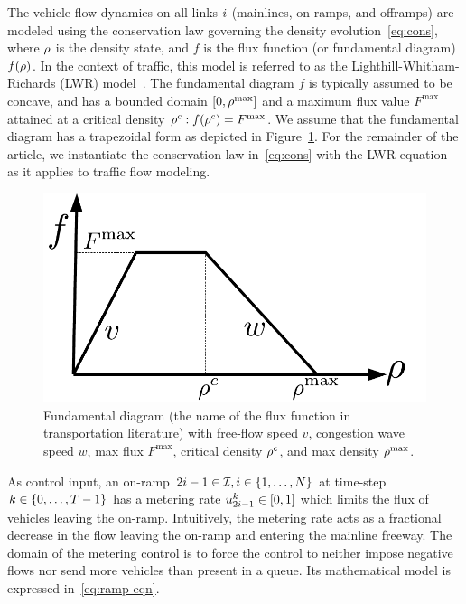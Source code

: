 				
		The vehicle flow dynamics on all links $i$ (mainlines, on-ramps,
		and offramps) are modeled using the conservation law governing the
		density evolution~\eqref{eq:cons}, where $\rho$ is the
		density state, and $f$ is the flux function (or fundamental diagram)
		$f\left(\density\right)$. In the context of traffic, this model is
		referred to as the Lighthill-Whitham-Richards (LWR) model~\cite{lighthill1955kinematic,richards1956shock}.
		The fundamental diagram $f$ is typically assumed to be concave, and
		has a bounded domain $\left[0,\density^{\max}\right]$ and a maximum
		flux value $F^{\max}$ attained at a critical density $\density^{c}:f\left(\density^{c}\right)=F^{\max}$.
		We assume that the fundamental diagram has a trapezoidal form as depicted
		in Figure~\ref{fig:Fundamental-diagram-with}. For the remainder
		of the article, we instantiate the conservation law in~\eqref{eq:cons}
		with the LWR equation as it applies to traffic flow modeling.\begin{figure}%
		\begin{centering}
			\includegraphics[width=0.4\columnwidth]{figs-gen/fd}
			\par\end{centering}
						
			\caption{Fundamental diagram (the name of the flux function in transportation
				literature) with free-flow speed $v$, congestion wave speed $w$,
				max flux $F^{\max}$, critical density $\rho^{c}$, and max density
				$\rho^{\max}$.\label{fig:Fundamental-diagram-with}}
			\end{figure}%
						
						
			As control input, an on-ramp $2\link-1\in\links,\link\in\intrange 1{\nlinks}$
			at time-step $k\in\intrange 0{\ntime-1}$ has a metering rate $\ramp_{2\link-1}^{\tind}\in\left[0,1\right]$
			which limits the flux of vehicles leaving the on-ramp. Intuitively,
			the metering rate acts as a fractional decrease in the flow leaving
			the on-ramp and entering the mainline freeway. The domain of the metering
			control is to force the control to neither impose negative flows nor
			send more vehicles than present in a queue. Its mathematical model
			is expressed in~\eqref{eq:ramp-eqn}.
						
